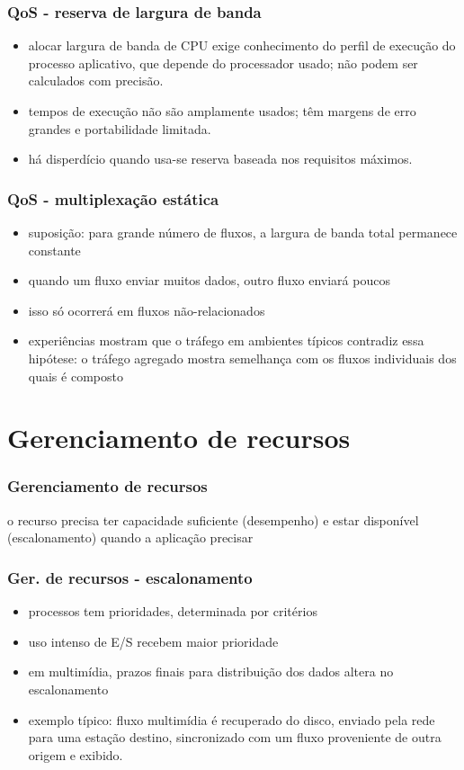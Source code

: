 \documentclass[]{beamer}
\begin{document}
\begin{frame}
  \frametitle{QoS - reserva de largura de banda}
\begin{itemize}
  \item alocar largura de banda de CPU exige conhecimento do perfil de execução do processo
aplicativo, que depende do processador usado; não podem ser calculados com precisão.
  \item tempos de execução não são amplamente usados; têm margens de erro grandes e 
portabilidade limitada.
  \item há disperdício quando usa-se reserva baseada nos requisitos máximos.
\end{itemize}
\end{frame}

\begin{frame}
  \frametitle{QoS - multiplexação estática}
\begin{itemize}
  \item suposição: para grande número de fluxos, a largura de banda total
permanece constante
  \item quando um fluxo enviar muitos dados, outro fluxo enviará poucos
  \item isso só ocorrerá em fluxos não-relacionados
  \item experiências mostram que o tráfego em ambientes típicos contradiz essa hipótese:
o tráfego agregado mostra semelhança com os fluxos individuais dos quais é composto
\end{itemize}
\end{frame}

\section{Gerenciamento de recursos}

\begin{frame}
  \frametitle{Gerenciamento de recursos}
  o recurso precisa ter capacidade suficiente (desempenho) e estar disponível
(escalonamento) quando a aplicação precisar
\end{frame}

\begin{frame}
  \frametitle{Ger. de recursos - escalonamento}
\begin{itemize}
  \item processos tem prioridades, determinada por critérios
  \item uso intenso de E/S recebem maior prioridade
  \item em multimídia, prazos finais para distribuição dos dados altera no escalonamento
  \item exemplo típico: fluxo multimídia é recuperado do disco, enviado pela rede para
uma estação destino, sincronizado com um fluxo proveniente de outra origem e exibido.
\end{itemize}
\end{frame}
\end{document}
